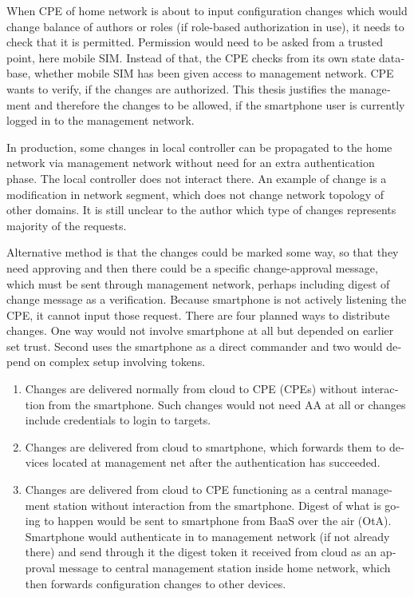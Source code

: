 \documentclass[12pt,a4paper,english]{tutthesis}
\begin{document}
\begin{otherlanguage}{english}
When CPE of home network is about to input configuration changes which
would change balance of authors or roles (if role-based authorization
in use), it needs to check that it is permitted.  Permission would 
need to be asked from a trusted point, here mobile SIM. Instead of
that, the CPE checks from its own state database, 
whether mobile SIM has been given access to management network.
CPE wants to verify, if the changes are authorized. This thesis
justifies the management and therefore the changes to be allowed, if
the smartphone user is currently logged in to the management network.


In production, some changes in local controller can be propagated to
the home network via management network without need for an extra
authentication phase.  The local controller does not interact
there. An example of change is a modification in network segment,
which does not change network topology of other domains.
It is still unclear to the author which type of changes represents majority of
the requests.



Alternative method is that the changes could be marked some way, so that they need
approving and then there could be a specific change-approval message,
which must be sent through management network, perhaps including digest
of change message as a verification.
Because smartphone is not actively listening the CPE, it cannot input
those request. There are four planned ways to distribute changes. One
way would not involve smartphone at all but depended on earlier set
trust. Second uses the smartphone as a direct commander and two would depend
on complex setup involving tokens.

\begin{enumerate}
\item Changes are delivered normally from cloud to CPE (CPEs) without
interaction from the smartphone. Such changes would not need
AA at all or changes include credentials to login to targets.

\item Changes are delivered from cloud to smartphone, which forwards them
to devices located at management net after the
authentication has succeeded.

\item Changes are delivered from cloud to CPE functioning as a central
management station without interaction from the smartphone.  Digest
of what is going to happen would be sent to smartphone from BaaS
over the air (OtA). Smartphone would authenticate in to management
network (if not already there) and send through it the digest token
it received from cloud as an approval message to central management
station inside home network, which then forwards configuration changes
to other devices.


\end{enumerate}
\end{otherlanguage}
\end{document}

